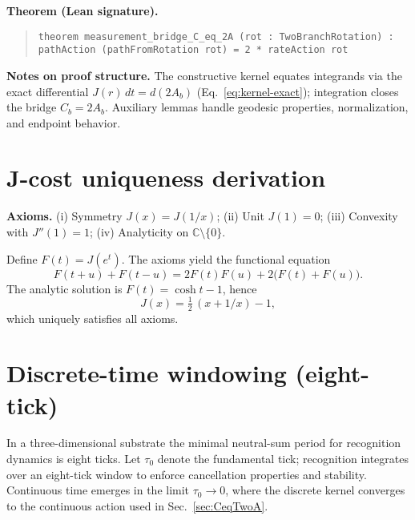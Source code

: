 \documentclass[reprint,aps,prd,nofootinbib]{revtex4-2}
\begin{document}
\noindent\textbf{Theorem (Lean signature).}
\begin{quote}
\texttt{theorem measurement\_bridge\_C\_eq\_2A (rot : TwoBranchRotation) :\\
  pathAction (pathFromRotation rot) = 2 * rateAction rot}
\end{quote}
\noindent\textbf{Notes on proof structure.} The constructive kernel equates integrands via the exact differential $J(r)\,dt=d(2A_b)$ (Eq.~\eqref{eq:kernel-exact}); integration closes the bridge $C_b=2A_b$. Auxiliary lemmas handle geodesic properties, normalization, and endpoint behavior.

\section{J-cost uniqueness derivation}
\noindent\textbf{Axioms.} (i) Symmetry $J(x)=J(1/x)$; (ii) Unit $J(1)=0$; (iii) Convexity with $J''(1)=1$; (iv) Analyticity on $\mathbb{C}\setminus\{0\}$.

\noindent Define $F(t)=J(e^t)$. The axioms yield the functional equation
\begin{equation}
  F(t+u)+F(t-u)=2F(t)F(u)+2\big(F(t)+F(u)\big).\label{eq:functional}
\end{equation}
The analytic solution is $F(t)=\cosh t - 1$, hence
\begin{equation}
  J(x)=\tfrac{1}{2}\,(x+1/x)-1,\label{eq:J-solution}
\end{equation}
which uniquely satisfies all axioms.

\section{Discrete-time windowing (eight-tick)}
In a three-dimensional substrate the minimal neutral-sum period for recognition dynamics is eight ticks. Let $\tau_0$ denote the fundamental tick; recognition integrates over an eight-tick window to enforce cancellation properties and stability. Continuous time emerges in the limit $\tau_0\to 0$, where the discrete kernel converges to the continuous action used in Sec.~\ref{sec:CeqTwoA}.
\end{document}

